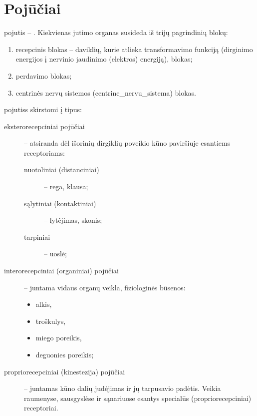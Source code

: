\section{Pojūčiai}

\label{tema:pojuciai}

\Gls{pojutis} – . Kiekvienas jutimo organas
susideda iš trijų pagrindinių blokų:
\begin{enumerate}
  \item recepcinis blokas – daviklių, kurie atlieka transformavimo funkciją 
    (dirginimo energijos į nervinio jaudinimo (elektros) energiją), blokas;
  \item perdavimo blokas;
  \item centrinės nervų sistemos (\gls{centrine_nervu_sistema}) blokas.
\end{enumerate}

\Glspl{pojutis} skirstomi į tipus: 
\begin{description}
  \item[eksterorecepciniai pojūčiai] – atsiranda dėl išorinių dirgiklių
    poveikio kūno paviršiuje esantiems receptoriams:
    \begin{description}
      \item[nuotoliniai (distanciniai)] – rega, klausa;
      \item[sąlytiniai (kontaktiniai)] – lytėjimas, skonis;
      \item[tarpiniai] – uoslė;
    \end{description}
  \item[interorecepciniai (organiniai) pojūčiai] – juntama vidaus organų
    veikla, fiziologinės būsenos:
    \begin{itemize}
      \item alkis,
      \item troškulys,
      \item miego poreikis,
      \item deguonies poreikis;
    \end{itemize}
  \item[propriorecepciniai (\gls{kinestezija}) pojūčiai] – juntamas kūno
    dalių judėjimas ir jų tarpusavio padėtis. Veikia raumenyse, sausgyslėse
    ir sąnariuose esantys specialūs (propriorecepciniai) receptoriai.
\end{description}


